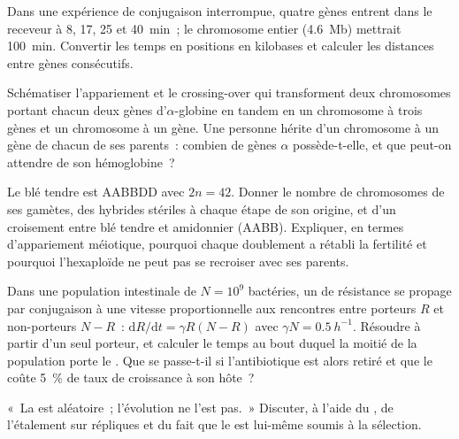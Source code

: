 \begin{exercise}[$\star\star$]\label{exo:b2:genome-diversification:8}
Dans une expérience de conjugaison interrompue, quatre gènes entrent
dans le receveur à 8, 17, 25 et \qty{40}{min}~; le chromosome entier
(\qty{4.6}{Mb}) mettrait \qty{100}{min}. Convertir les temps en
positions en kilobases et calculer les distances entre gènes
consécutifs.
\end{exercise}

\begin{exercise}[$\star\star$]\label{exo:b2:genome-diversification:9}
Schématiser l'appariement et le crossing-over qui transforment deux
chromosomes portant chacun deux gènes d'$\alpha$-globine en tandem en
un chromosome à trois gènes et un chromosome à un gène. Une personne
hérite d'un chromosome à un gène de chacun de ses parents~: combien de
gènes $\alpha$ possède-t-elle, et que peut-on attendre de son
hémoglobine~?
\end{exercise}

\begin{exercise}[$\star\star\star$]\label{exo:b2:genome-diversification:10}
Le blé tendre est AABBDD avec $2n = 42$. Donner le nombre de
chromosomes de ses gamètes, des hybrides stériles à chaque étape de son
origine, et d'un croisement entre blé tendre et amidonnier (AABB).
Expliquer, en termes d'appariement méiotique, pourquoi chaque
doublement a rétabli la fertilité et pourquoi l'hexaploïde ne peut pas
se recroiser avec ses parents.
\end{exercise}

\begin{exercise}[$\star\star\star$]\label{exo:b2:genome-diversification:11}
Dans une population intestinale de $N = 10^{9}$ bactéries, un 
de résistance se propage par conjugaison à une vitesse proportionnelle
aux rencontres entre porteurs $R$ et non-porteurs $N - R$~:
$\mathrm{d}R/\mathrm{d}t =
\gamma R (N - R)$ avec $\gamma N = \qty{0.5}{h^{-1}}$. Résoudre à partir
d'un seul porteur, et calculer le temps au bout duquel la moitié de la
population porte le . Que se passe-t-il si l'antibiotique est
alors retiré et que le  coûte \qty{5}{\%} de taux de croissance
à son hôte~?
\end{exercise}

\begin{exercise}[$\star\star\star$]\label{exo:b2:genome-diversification:12}
«~La  est aléatoire~; l'évolution ne l'est pas.~» Discuter, à
l'aide du , de l'étalement sur répliques et du fait
que le  est lui-même soumis à la sélection.
\end{exercise}

